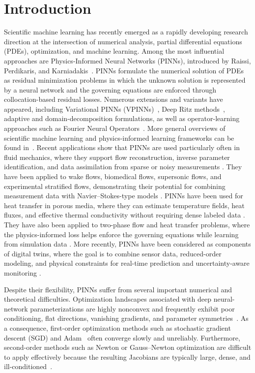 \documentclass[review]{elsarticle}
\begin{document}
\section{Introduction}

Scientific machine learning has recently emerged as a rapidly developing research direction at the intersection of numerical analysis, partial differential equations (PDEs), optimization, and machine learning. Among the most influential approaches are Physics-Informed Neural Networks (PINNs), introduced by Raissi, Perdikaris, and Karniadakis~\cite{raissi}. PINNs formulate the numerical solution of PDEs as residual minimization problems in which the unknown solution is represented by a neural network and the governing equations are enforced through collocation-based residual losses.
Numerous extensions and variants have appeared, including Variational PINNs (VPINNs)~\cite{vpinn}, Deep Ritz methods~\cite{deepritz}, adaptive and domain-decomposition formulations, as well as operator-learning approaches such as Fourier Neural Operators~\cite{operatorlearning}. More general overviews of scientific machine learning and physics-informed learning frameworks can be found in~\cite{karniadakis_book}.
Recent applications show
that PINNs are used particularly often in fluid mechanics, where they support
flow reconstruction, inverse parameter identification, and data assimilation
from sparse or noisy measurements \cite{Cai2021}. They have been applied to
wake flows, biomedical flows, supersonic flows, and experimental stratified
flows, demonstrating their potential for combining measurement data with
Navier--Stokes-type models \cite{Cai2021,Zhu2024}.
PINNs have been used for heat transfer in porous media, where they
can estimate temperature fields, heat fluxes, and effective thermal
conductivity without requiring dense labeled data \cite{Xu2023}. They have
also been applied to two-phase flow and heat transfer problems, where the
physics-informed loss helps enforce the governing equations while learning from
simulation data \cite{Jalili2024}. More recently, PINNs have been considered
as components of digital twins, where the goal is to combine sensor data,
reduced-order modeling, and physical constraints for real-time prediction and
uncertainty-aware monitoring \cite{Yang2024}. 

Despite their flexibility, PINNs suffer from several important numerical and theoretical difficulties. Optimization landscapes associated with deep neural-network parameterizations are highly nonconvex and frequently exhibit poor conditioning, flat directions, vanishing gradients, and parameter symmetries~\cite{wang2021understanding}. As a consequence, first-order optimization methods such as stochastic gradient descent (SGD) and Adam~\cite{Adam} often converge slowly and unreliably. Furthermore, second-order methods such as Newton or Gauss–Newton optimization are difficult to apply effectively because the resulting Jacobians are typically large, dense, and ill-conditioned~\cite{nocedal}.
\end{document}
